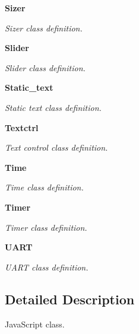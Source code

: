 \begin{DoxyCompactItemize}
\textbf{ Sizer}
\begin{DoxyCompactList}\small\item\em Sizer class definition. \end{DoxyCompactList}\item 
\textbf{ Slider}
\begin{DoxyCompactList}\small\item\em Slider class definition. \end{DoxyCompactList}\item 
\textbf{ Static\+\_\+text}
\begin{DoxyCompactList}\small\item\em Static text class definition. \end{DoxyCompactList}\item 
\textbf{ Textctrl}
\begin{DoxyCompactList}\small\item\em Text control class definition. \end{DoxyCompactList}\item 
\textbf{ Time}
\begin{DoxyCompactList}\small\item\em Time class definition. \end{DoxyCompactList}\item 
\textbf{ Timer}
\begin{DoxyCompactList}\small\item\em Timer class definition. \end{DoxyCompactList}\item 
\textbf{ U\+A\+RT}
\begin{DoxyCompactList}\small\item\em U\+A\+RT class definition. \end{DoxyCompactList}\end{DoxyCompactItemize}


\subsection{Detailed Description}
Java\+Script class. 

